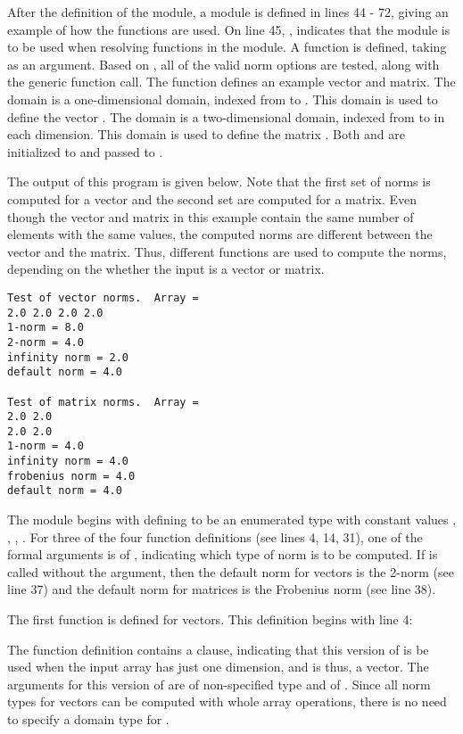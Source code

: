 After the definition of the  module, a  module
is defined in lines 44 - 72, giving an example of how the  functions are used.
On line 45, , indicates that the  module is to be
used when resolving functions in the  module.  A 
function is defined, taking  as an argument.  Based on ,
all of the valid norm options are tested, along with the generic 
function call.  The  function defines an example vector and matrix.
The domain  is a one-dimensional domain, indexed
from  to .  This domain is used to define the vector
.  The domain  is a two-dimensional domain, indexed from 
to  in each dimension.  This domain is used to define the matrix .
Both  and  are initialized to  and passed to
.

The output of this program is given below.  Note that the first set
of norms is computed for a vector and the second set are computed for
a matrix. Even though the vector and matrix in this example contain
the same number of elements with the same values, the computed norms
are different between the vector and the matrix.  Thus, different
functions are used to compute the norms, depending on the whether the
input is a vector or matrix.

\begin{verbatim}
Test of vector norms.  Array = 
2.0 2.0 2.0 2.0
1-norm = 8.0
2-norm = 4.0
infinity norm = 2.0
default norm = 4.0

Test of matrix norms.  Array = 
2.0 2.0
2.0 2.0
1-norm = 4.0
infinity norm = 4.0
frobenius norm = 4.0
default norm = 4.0
\end{verbatim}

The  module begins with defining  to be an
enumerated type with constant values , , 
, .
For three of the four  function definitions (see lines 4, 14, 31), 
one of the formal arguments is of , indicating which type of norm 
is to be computed.  If  is called without the  argument,
then the default norm for vectors is the 2-norm (see line 37) and the default
norm for matrices is the Frobenius norm (see line 38).  

The first  function is defined for vectors.  This definition
begins with line 4:
\begin{chapel}
  def norm(x, p: normType) where x.rank == 1 {
\end{chapel}
The function definition contains a  clause, indicating that
this version of  is be used when the input array 
has just one dimension, and is thus, a vector.  The arguments for this version
of  are  of non-specified type and  of .  
Since all norm types for vectors can be computed with whole array operations, there 
is no need to specify a domain type for .

